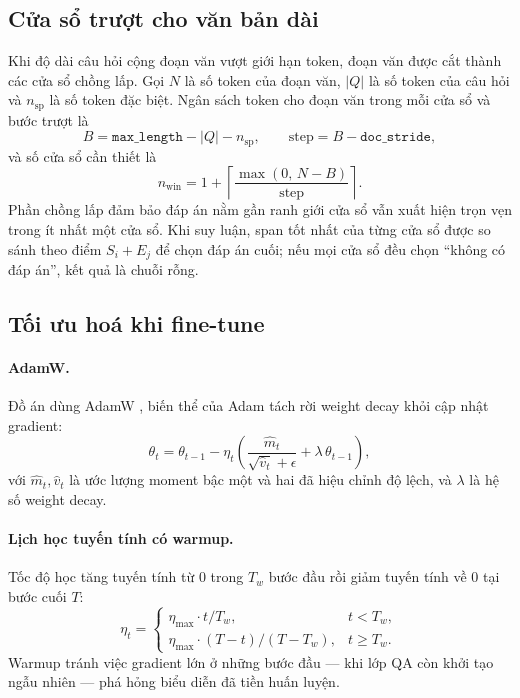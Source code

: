 \subsection{Cửa sổ trượt cho văn bản dài}
\label{sec:docstride}

Khi độ dài câu hỏi cộng đoạn văn vượt giới hạn  token, đoạn văn được
cắt thành các cửa sổ chồng lấp. Gọi $N$ là số token của đoạn văn, $|Q|$ là số token của
câu hỏi và $n_{\text{sp}}$ là số token đặc biệt. Ngân sách token cho đoạn văn trong mỗi
cửa sổ và bước trượt là
\begin{equation}
  B = \texttt{max\_length} - |Q| - n_{\text{sp}}, \qquad
  \text{step} = B - \texttt{doc\_stride},
\end{equation}
và số cửa sổ cần thiết là
\begin{equation}
  n_{\text{win}} = 1 + \left\lceil \frac{\max(0,\, N - B)}{\text{step}} \right\rceil .
  \label{eq:nwin}
\end{equation}
Phần chồng lấp  đảm bảo đáp án nằm gần ranh giới cửa sổ vẫn xuất hiện
trọn vẹn trong ít nhất một cửa sổ. Khi suy luận, span tốt nhất của từng cửa sổ được so
sánh theo điểm $S_i + E_j$ để chọn đáp án cuối; nếu mọi cửa sổ đều chọn ``không có đáp
án'', kết quả là chuỗi rỗng.

\subsection{Tối ưu hoá khi fine-tune}
\label{sec:optim}

\paragraph{AdamW.} Đồ án dùng AdamW \cite{loshchilov2019adamw}, biến thể của Adam tách
rời weight decay khỏi cập nhật gradient:
\begin{equation}
  \theta_{t} = \theta_{t-1} - \eta_t \left( \frac{\hat{m}_t}{\sqrt{\hat{v}_t} + \epsilon} + \lambda\, \theta_{t-1} \right),
\end{equation}
với $\hat{m}_t, \hat{v}_t$ là ước lượng moment bậc một và hai đã hiệu chỉnh độ lệch, và
$\lambda$ là hệ số weight decay.

\paragraph{Lịch học tuyến tính có warmup.} Tốc độ học tăng tuyến tính từ 0 trong $T_w$
bước đầu rồi giảm tuyến tính về 0 tại bước cuối $T$:
\begin{equation}
  \eta_t =
  \begin{cases}
    \eta_{\max} \cdot t / T_w, & t < T_w, \\
    \eta_{\max} \cdot (T - t) / (T - T_w), & t \ge T_w.
  \end{cases}
\end{equation}
Warmup tránh việc gradient lớn ở những bước đầu --- khi lớp QA còn khởi tạo ngẫu nhiên
--- phá hỏng biểu diễn đã tiền huấn luyện.

